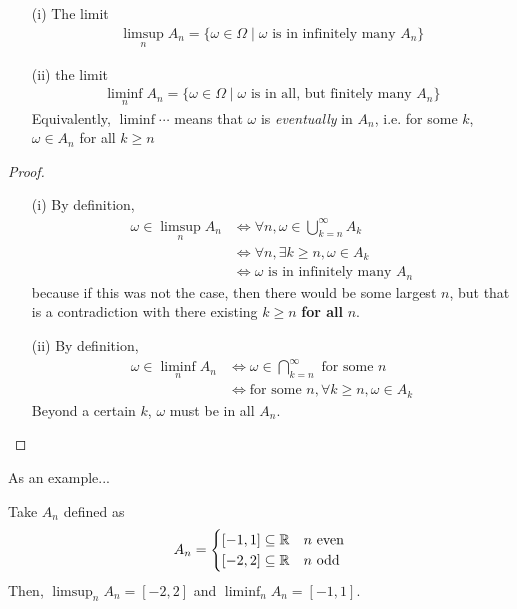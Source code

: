 \begin{proposition}
    \begin{enumerate}
        \item[(i)] The limit
        \begin{align}
            \limsup_n A_n = \{ \omega \in \Omega \mid \omega \text{ is in infinitely many } A_n \}
        \end{align}
        \item[(ii)] the limit
        \begin{align}
            \liminf_n A_n = \{ \omega \in \Omega \mid \omega \text{ is in all, but finitely many } A_n \}
        \end{align}
        Equivalently, $\liminf \cdots$ means that $\omega$ is \textit{eventually} in $A_n$, i.e. for some $k$, $\omega \in A_n$ for all $k \ge n$
    \end{enumerate}
\end{proposition}
\begin{proof}
    \begin{enumerate}
        \item[(i)] By definition,
        \begin{align}
            \omega \in \limsup_n A_n
            &\iff \forall n, \omega \in \bigcup_{k=n}^\infty A_k\\
            &\iff \forall n, \exists k \ge n, \omega \in A_k\\
            &\iff \omega \text{ is in infinitely many } A_n
        \end{align}
        because if this was not the case, then there would be some largest $n$, but that is a contradiction with there existing $k \ge n$ \textbf{for all} $n$.

        \item[(ii)] By definition,
        \begin{align}
            \omega \in \liminf_n A_n
            &\iff \omega \in \bigcap_{k=n}^\infty \text{ for some } n\\
            &\iff \text{for some } n, \forall k \ge n, \omega \in A_k
        \end{align}
        Beyond a certain $k$, $\omega$ must be in all $A_n$.
    \end{enumerate}
\end{proof}

As an example...
\begin{example}
    Take $A_n$ defined as
    \begin{align}
        A_n = \begin{cases}
            [-1,1] \subseteq \mathbb{R} & n \text{ even}\\
            [-2,2] \subseteq \mathbb{R} & n \text{ odd}
        \end{cases}
    \end{align}
    Then, $\limsup_n A_n = [-2,2]$ and $\liminf_n A_n = [-1,1]$.
\end{example}

